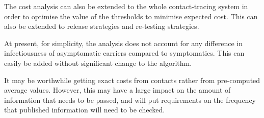\documentclass{article}
\begin{document}
The cost analysis can also be extended to the whole contact-tracing system in order to optimise the value of the thresholds to minimise expected cost. This can also be extended to release strategies and re-testing strategies.

At present, for simplicity, the analysis does not account for any difference in infectiousness of asymptomatic carriers compared to symptomatics. This can easily be added without significant change to the algorithm.

It may be worthwhile getting exact costs from contacts rather from pre-computed average values. However, this may have a large impact on the amount of information that needs to be passed, and will put requirements on the frequency that published information will need to be checked.

%

%
%
% 
%

\end{document}

